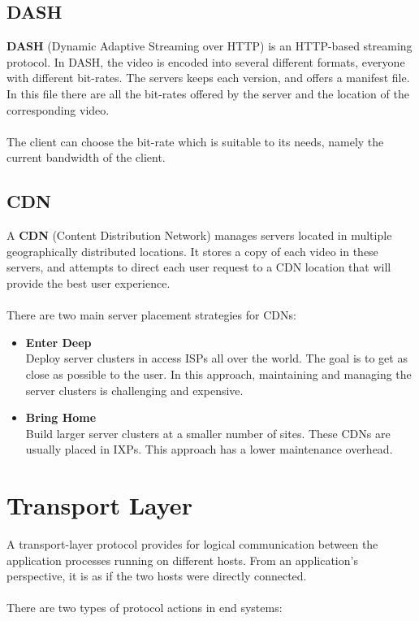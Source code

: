 \documentclass{article}
\begin{document}
\subsection{DASH}
\textbf{DASH} (Dynamic Adaptive Streaming over HTTP) is an HTTP-based streaming protocol. In DASH, the video is encoded into several different formats, everyone with different bit-rates. The servers keeps each version, and offers a manifest file. In this file there are all the bit-rates offered by the server and the location of the corresponding video. \\ \\
The client can choose the bit-rate which is suitable to its needs, namely the current bandwidth of the client.

\subsection{CDN}
A \textbf{CDN} (Content Distribution Network) manages servers located in multiple geographically distributed locations. It stores a copy of each video in these servers, and attempts to direct each user request to a CDN location that will provide the best user experience. \\ \\
There are two main server placement strategies for CDNs:

\begin{itemize}
	\item \textbf{Enter Deep}
	\vspace{.2cm} \\
	Deploy server clusters in access ISPs all over the world. The goal is to get as close as possible to the user. In this approach, maintaining and managing the server clusters is challenging and expensive.
	
	\item \textbf{Bring Home}
	\vspace{.2cm} \\
	Build larger server clusters at a smaller number of sites. These CDNs are usually placed in IXPs. This approach has a lower maintenance overhead.
\end{itemize}

\section{Transport Layer}
A transport-layer protocol provides for logical communication between the application processes running on different hosts. From an application's perspective, it is as if the two hosts were directly connected. \\ \\
There are two types of protocol actions in end systems:
\end{document}
